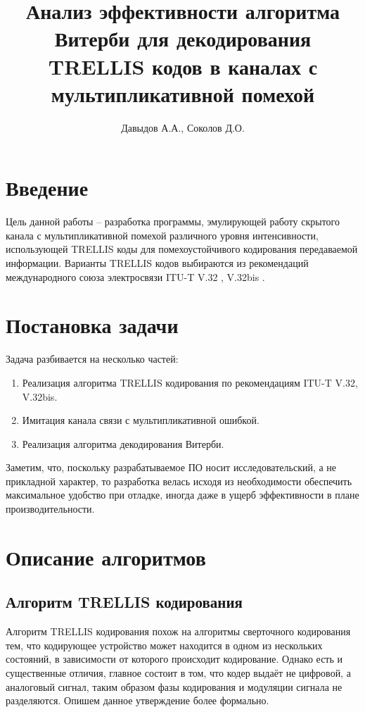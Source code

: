 \documentclass[a4paper,12pt]{article}
\begin{document}
\lstset{language=Java}

\title{Анализ эффективности алгоритма Витерби для декодирования TRELLIS кодов в каналах с мультипликативной помехой}
\author{Давыдов А.А., Соколов Д.О.}

\maketitle
\newpage

\section{Введение}

Цель данной работы – разработка программы, эмулирующей работу скрытого канала с мультипликативной помехой 
различного уровня интенсивности, использующей TRELLIS коды для помехоустойчивого кодирования передаваемой
информации. Варианты TRELLIS кодов выбираются из рекомендаций международного союза электросвязи 
ITU-T V.32 \cite{stV32}, V.32bis \cite{stV32bis}. 

\section{Постановка задачи}
Задача разбивается на несколько частей:

\begin{enumerate}
    \item Реализация алгоритма TRELLIS кодирования по рекомендациям ITU-T V.32, V.32bis.
    \item Имитация канала связи с мультипликативной ошибкой.
    \item Реализация алгоритма декодирования Витерби.
\end{enumerate}

Заметим, что, поскольку разрабатываемое ПО носит исследовательский, а не прикладной характер, то разработка
велась исходя из необходимости обеспечить максимальное удобство при отладке, иногда даже в ущерб эффективности
в плане производительности.

\section{Описание алгоритмов}

\subsection{Алгоритм TRELLIS кодирования}
Алгоритм TRELLIS кодирования похож на алгоритмы сверточного кодирования тем, что кодирующее устройство может
находится в одном из нескольких состояний, в зависимости от которого происходит кодирование. Однако есть и
существенные отличия, главное состоит в том, что кодер выдаёт не цифровой, а аналоговый сигнал, таким образом
фазы кодирования и модуляции сигнала не разделяются.
Опишем данное утверждение более формально.
\end{document}
